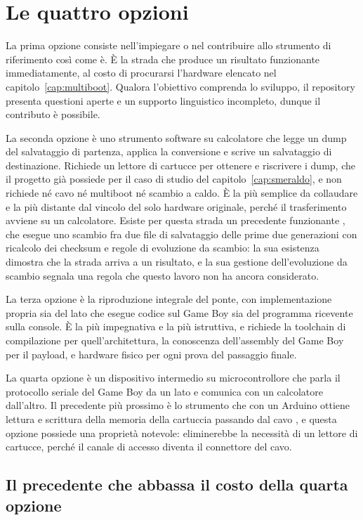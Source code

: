 \section{Le quattro opzioni}

La prima opzione consiste nell'impiegare o nel contribuire allo strumento di riferimento così come è. È la strada che produce un risultato funzionante immediatamente, al costo di procurarsi l'hardware elencato nel capitolo~\ref{cap:multiboot}. Qualora l'obiettivo comprenda lo sviluppo, il repository presenta questioni aperte e un supporto linguistico incompleto, dunque il contributo è possibile.

La seconda opzione è uno strumento software su calcolatore che legge un dump del salvataggio di partenza, applica la conversione e scrive un salvataggio di destinazione. Richiede un lettore di cartucce per ottenere e riscrivere i dump, che il progetto già possiede per il caso di studio del capitolo~\ref{cap:smeraldo}, e non richiede né cavo né multiboot né scambio a caldo. È la più semplice da collaudare e la più distante dal vincolo del solo hardware originale, perché il trasferimento avviene su un calcolatore. Esiste per questa strada un precedente funzionante \cite{pokerom-trader}, che esegue uno scambio fra due file di salvataggio delle prime due generazioni con ricalcolo dei checksum e regole di evoluzione da scambio: la sua esistenza dimostra che la strada arriva a un risultato, e la sua gestione dell'evoluzione da scambio segnala una regola che questo lavoro non ha ancora considerato.

La terza opzione è la riproduzione integrale del ponte, con implementazione propria sia del lato che esegue codice sul Game Boy sia del programma ricevente sulla console. È la più impegnativa e la più istruttiva, e richiede la toolchain di compilazione per quell'architettura, la conoscenza dell'assembly del Game Boy per il payload, e hardware fisico per ogni prova del passaggio finale.

La quarta opzione è un dispositivo intermedio su microcontrollore che parla il protocollo seriale del Game Boy da un lato e comunica con un calcolatore dall'altro. Il precedente più prossimo è lo strumento che con un Arduino ottiene lettura e scrittura della memoria della cartuccia passando dal cavo \cite{pksploit}, e questa opzione possiede una proprietà notevole: eliminerebbe la necessità di un lettore di cartucce, perché il canale di accesso diventa il connettore del cavo.

\subsection{Il precedente che abbassa il costo della quarta opzione}

